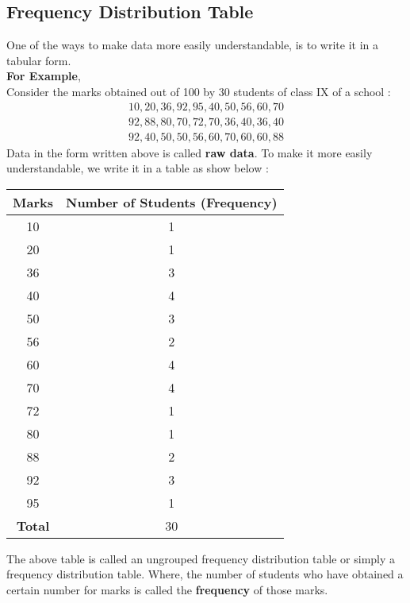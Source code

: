 \documentclass[12pt, letterpaper]{article}
\begin{document}
\subsection{Frequency Distribution Table}
One of the ways to make data more easily understandable, is to write it in a tabular form.\\
\textbf{For Example},\\
Consider the marks obtained out of 100 by 30 students of class IX of a school : 
\begin{align*}
    10,20,36,92,95,40,50,56,60,70 \\
    92,88,80,70,72,70,36,40,36,40 \\
    92,40,50,50,56,60,70,60,60,88
\end{align*}
Data in the form written above is called \textbf{raw data}. To make it more easily understandable, we write it in a table as show below : 
\begin{center}
\begin{tabular}{ |c|c| } 
 \hline
 \textbf{Marks} & \textbf{Number of Students (Frequency)} \\ 
 \hline
 10 & 1 \\ 
 20 & 1 \\
 36 & 3 \\
 40 & 4 \\
 50 & 3 \\
 56 & 2 \\
 60 & 4 \\
 70 & 4 \\
 72 & 1 \\
 80 & 1 \\
 88 & 2 \\
 92 & 3 \\
 95 & 1 \\
 \hline
 \textbf{Total} & 30 \\
 \hline
\end{tabular}
\end{center}
The above table is called an ungrouped frequency distribution table or simply a frequency distribution table. Where, the number of students who have obtained a certain number for marks is called the \textbf{frequency} of those marks.
\end{document}

